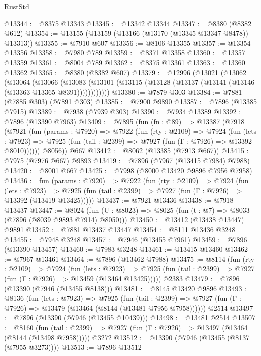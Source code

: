 \begin{lexlean}{RustStd}
\begin{coremodule}
@13344 := @8375 @13343
@13345 := @13342 @13344
@13347 := @8380 (@8382 @612)
@13354 := @13155 (@13159 (@13166 (@13170 (@13345 @13347 @8478)) @13313))
@13355 := @7910 @607
@13356 := @8106 @13355
@13357 := @13354 @13356
@13358 := @7980 @789
@13359 := @8371 @13358
@13360 := @13357 @13359
@13361 := @8004 @789
@13362 := @8375 @13361
@13363 := @13360 @13362
@13365 := @8380 (@8382 @607)
@13379 := @12996
    (@13021
      (@13062
        (@13064
          (@13066
            (@13083 (@13101 (@13115 (@13128 (@13137 (@13141 (@13146 (@13363 @13365 @8391))))))))))))
@13380 := @7879 @303
@13384 := @7881 (@7885 @303) (@7891 @303)
@13385 := @7900 @9890
@13387 := @7896 (@13385 @7915)
@13389 := @7938 (@7939 @303)
@13390 := @7934 @13389
@13392 := @7896 (@13390 @7963)
@13409 := @7895
    (fun (fn : @89) =>
    @13387
      (@7918
        (@7921
          (fun (params : @7920) =>
          @7922
            (fun (rty : @2109) =>
            @7924
              (fun (lets : @7923) =>
              @7925 (fun (tail : @2399) => @7927 (fun (Γ : @7926) => @13392 @8010))))))
        @8056))
    @667
@13412 := @8062 (@13385 (@7913 @667))
@13415 := @7975 (@7976 @667) @9893
@13419 := @7896 (@7967 (@13415 @7984) @7988)
@13420 := @8001 @667
@13425 := @7998 (@8000 @13420 @9896 @7956 @7958)
@13436 := fun (params : @7920) =>
  @7922
    (fun (rty : @2109) =>
    @7924
      (fun (lets : @7923) =>
      @7925 (fun (tail : @2399) => @7927 (fun (Γ : @7926) => @13392 (@13419 @13425)))))
@13437 := @7921 @13436
@13438 := @7918 @13437
@13447 := @8024 (fun (U : @8023) => @8025 (fun (t : @7) => @8033 (@7896 (@8039 @9893 @7914) @8050)))
@13450 := @13412 (@13438 @13447) @9891
@13452 := @7881 @13437 @13447
@13454 := @8111 @13436 @3248
@13455 := @7948 @3248
@13457 := @7946 (@13455 @7961)
@13459 := @7896 (@13390 @13457)
@13460 := @7983 @3248
@13461 := @13415 @13460
@13462 := @7967 @13461
@13464 := @7896 (@13462 @7988)
@13475 := @8114
    (fun (rty : @2109) =>
    @7924
      (fun (lets : @7923) =>
      @7925 (fun (tail : @2399) => @7927 (fun (Γ : @7926) => @13459 (@13464 @13425)))))
    @2383
@13479 := @7896 (@13390 (@7946 (@13455 @8138)))
@13481 := @8145 @13420 @9896
@13493 := @8136
    (fun (lets : @7923) =>
    @7925
      (fun (tail : @2399) =>
      @7927 (fun (Γ : @7926) => @13479 (@13464 (@8144 (@13481 @7956 @7958))))))
    @2514
@13497 := @7896 (@13390 (@7946 (@13455 @10439)))
@13498 := @13481 @2514
@13507 := @8160
    (fun (tail : @2399) => @7927 (fun (Γ : @7926) => @13497 (@13464 (@8144 (@13498 @7958)))))
    @3272
@13512 := @13390 (@7946 (@13455 (@8137 (@7955 @3273))))
@13513 := @7896 @13512

\end{coremodule}
\end{lexlean}
